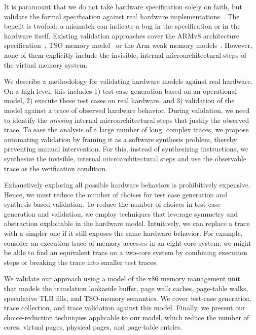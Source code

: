 It is paramount that we do not take hardware specification solely on faith, but 
validate the formal specification against real hardware implementations~\cite{reid2016trustworthy,armstrong2019sail}. 
The benefit is twofold: a mismatch can indicate a bug in the specification or in the hardware itself. 
Existing validation approaches cover the ARMv8 architecture specification~\cite{Reid:2017:ValidationArmv8},
TSO memory model~\cite{owens2009x86tso} or the Arm weak memory models~\cite{alglave2011litmus,alglave2014herding}.
However, none of them explicitly include the invisible, internal microarchitectural steps of the virtual memory system.

%
%
We describe a methodology for validating hardware models against real hardware.
On a high level, this includes 
1) test case generation based on an operational model,
2) execute these test cases on real hardware, and
3) validation of the model against a trace of observed hardware behavior.
During validation, we need to identify the \emph{missing} internal microarchitectural steps that justify the observed trace. 
To ease the analysis of a large number of long, complex traces, we propose automating validation by framing it as a software synthesis problem, thereby preventing manual intervention.
For this, instead of synthesizing instructions, we synthesize the invisible, internal microarchitectural steps and use the observable trace as the verification condition.

Exhaustively exploring all possible hardware behaviors is prohibitively expensive.
Hence, we must reduce the number of choices for test case generation and synthesis-based validation.
To reduce the number of choices in test case generation and validation, we employ techniques that leverage symmetry and abstraction exploitable in the hardware model.
Intuitively, we can replace a trace with a simpler one if it still exposes the same hardware behavior.
For example, consider an execution trace of memory accesses in an eight-core system; we might be able to find an equivalent trace on a two-core system by combining execution steps or breaking the trace into smaller test traces.

% 
%
We validate our approach using a model of the x86 memory management unit that models the translation lookaside buffer, page walk caches, page-table walks, speculative TLB fills, and TSO-memory semantics. 
We cover test-case generation, trace collection, and trace validation against this model. 
Finally, we present our choice-reduction techniques applicable to our model, which reduce the number of cores, virtual pages, physical pages, and page-table entries. 

